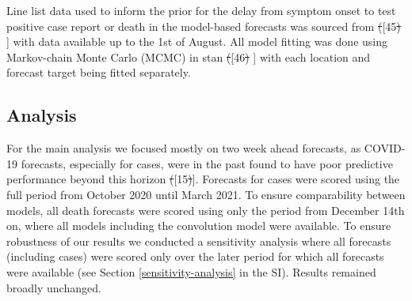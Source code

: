 \documentclass[10pt,letterpaper]{article} %
\providecommand{\DIFdeltex}[1]{{\protect\color{red}\sout{#1}}}                      %
\providecommand{\DIFaddbegin}{} %
\providecommand{\DIFaddend}{} %
\providecommand{\DIFdelbegin}{} %
\providecommand{\DIFdelend}{} %
\providecommand{\DIFdel}[1]{\texorpdfstring{\DIFdeltex{#1}}{}} %
\newcommand{\DIFscaledelfig}{0.5}
\newlength{\DIFdelgraphicswidth} %
\newlength{\DIFdelgraphicsheight} %
\newcommand{\DIFaddincludegraphics}[2][]{{\color{blue}\fbox{\DIFOincludegraphics[#1]{#2}}}} %
\newcommand{\DIFdelincludegraphics}[2][]{%
\sbox{\DIFdelgraphicsbox}{\DIFOincludegraphics[#1]{#2}}%
\settoboxwidth{\DIFdelgraphicswidth}{\DIFdelgraphicsbox} %
\settoboxtotalheight{\DIFdelgraphicsheight}{\DIFdelgraphicsbox} %
\scalebox{\DIFscaledelfig}{%
\parbox[b]{\DIFdelgraphicswidth}{\usebox{\DIFdelgraphicsbox}\\[-\baselineskip] \rule{\DIFdelgraphicswidth}{0em}}\llap{\resizebox{\DIFdelgraphicswidth}{\DIFdelgraphicsheight}{%
\setlength{\unitlength}{\DIFdelgraphicswidth}%
\begin{picture}(1,1)%
\thicklines\linethickness{2pt} %
{\color[rgb]{1,0,0}\put(0,0){\framebox(1,1){}}}%
{\color[rgb]{1,0,0}\put(0,0){\line( 1,1){1}}}%
{\color[rgb]{1,0,0}\put(0,1){\line(1,-1){1}}}%
\end{picture}%
}\hspace*{3pt}}} %
} %
\DeclareRobustCommand{\DIFaddbegin}{\DIFOaddbegin \let\includegraphics\DIFaddincludegraphics} %
\DeclareRobustCommand{\DIFaddend}{\DIFOaddend \let\includegraphics\DIFOincludegraphics} %
\DeclareRobustCommand{\DIFdelbegin}{\DIFOdelbegin \let\includegraphics\DIFdelincludegraphics} %
\DeclareRobustCommand{\DIFdelend}{\DIFOaddend \let\includegraphics\DIFOincludegraphics} %
\begin{document}
Line list data used to inform the prior for the delay from symptom onset
to test positive case report or death in the model-based forecasts was
sourced from \DIFdelbegin \DIFdel{(}\DIFdelend \DIFaddbegin {[}\DIFaddend 45\DIFdelbegin \DIFdel{) }\DIFdelend \DIFaddbegin {]} \DIFaddend with data available up to the 1st of August. All
model fitting was done using Markov-chain Monte Carlo (MCMC) in stan
\DIFdelbegin \DIFdel{(}\DIFdelend \DIFaddbegin {[}\DIFaddend 46\DIFdelbegin \DIFdel{) }\DIFdelend \DIFaddbegin {]} \DIFaddend with each location and forecast target being fitted separately.

\hypertarget{analysis}{%
\subsection{Analysis}\label{analysis}}

For the main analysis we focused mostly on two week ahead forecasts, as
COVID-19 forecasts, especially for cases, were in the past found to have
poor predictive performance beyond this horizon \DIFdelbegin \DIFdel{(}\DIFdelend \DIFaddbegin {[}\DIFaddend 15\DIFdelbegin \DIFdel{)}\DIFdelend \DIFaddbegin {]}\DIFaddend . Forecasts for
cases were scored using the full period from October 2020 until March
2021. To ensure comparability between models, all death forecasts were
scored using only the period from December 14th on, where all models
including the convolution model were available. To ensure robustness of
our results we conducted a sensitivity analysis where all forecasts
(including cases) were scored only over the later period for which all
forecasts were available (see Section \ref{sensitivity-analysis} in the
SI). Results remained broadly unchanged.
\end{document}
